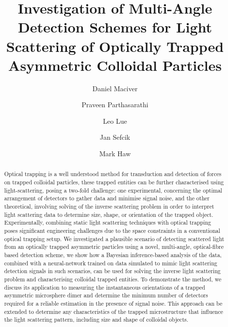 \documentclass[12pt]{spieman}
\title{Investigation of Multi-Angle Detection Schemes for Light Scattering of Optically Trapped Asymmetric Colloidal Particles}
\author[a*]{Daniel Maciver}
\author[a]{Praveen Parthasarathi}
\author[a]{Leo Lue}
\author[a]{Jan Sefcik}
\author[a]{Mark Haw}
\affil[a]{Department of Chemical Engineering,
	University of Strathclyde, 75 Montrose Street, Glasgow,
	G1 1XL, Scotland}
\begin{document}
	\maketitle
\begin{abstract}
  Optical trapping is a well understood method for transduction and detection
  of forces on trapped colloidal particles, these trapped entities can be
  further characterised using light-scattering, posing a two-fold challenge:
  one experimental, concerning the optimal arrangement of detectors to gather
  data and minimise signal noise, and the other theoretical, involving solving
  of the inverse scattering problem in order to interpret light scattering
  data to determine size, shape, or orientation of the trapped object.
  Experimentally, combining static light scattering techniques with optical
  trapping poses significant engineering challenges due to the space
  constraints in a conventional optical trapping setup. We investigated a
  plausible scenario of detecting scattered light from an optically trapped
  asymmetric particles using a novel, multi-angle, optical-fibre based
  detection scheme, we show how a Bayesian inference-based analysis of the
  data, combined with a neural-network trained on data simulated to mimic
  light scattering detection signals in such scenarios, can be used for
  solving the inverse light scattering problem and characterising colloidal
  trapped entities. To demonstrate the method, we discuss its application to
  measuring the instantaneous orientations of a trapped asymmetric microsphere
  dimer and determine the minimum number of detectors required for a reliable
  estimation in the presence of signal noise. This approach can be extended to
  determine any characteristics of the trapped microstructure that influence
  the light scattering pattern, including size and shape of colloidal objects. 
\end{abstract}

	
\end{document}
